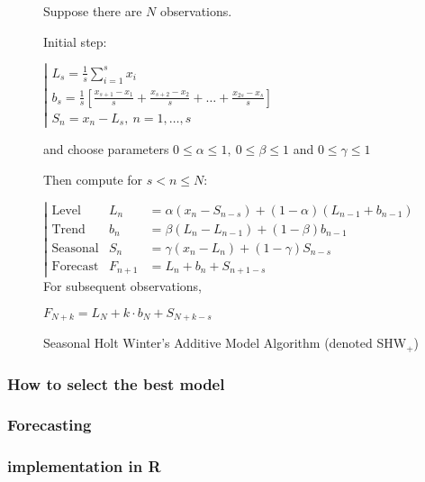 \begin{figure}[H]
\begin{tcolorbox}[width=.6\textwidth]%

Suppose there are $N$ observations.

Initial step:

$\left|\begin{array}{l}
L_s = \frac1s \sum_{i=1}^s x_i \\
b_s = \frac1s \left[\frac{x_{s+1}-x_1}{s}+\frac{x_{s+2}-x_2}{s}+\dots+\frac{x_{2s}-x_s}{s}\right]\\
S_n  = x_n-L_s, \ n=1,\dots,s
\end{array}\right.$

and choose parameters $0\leq\alpha\leq1,\ 0\leq\beta\leq1$ and $0\leq\gamma\leq1$

Then compute for $s<n\leq N$:

$\left|\begin{array}{lll}
\text{Level} &       L_n & = \alpha (x_n-S_{n-s})+(1-\alpha)(L_{n-1}+b_{n-1})\\
\text{Trend} &      b_n & = \beta(L_n-L_{n-1})+(1-\beta)b_{n-1}\\
\text{Seasonal} & S_n & = \gamma (x_n-L_n) + (1-\gamma)S_{n-s}\\
\text{Forecast} & F_{n+1} & = L_n+b_n+S_{n+1-s}
\end{array}\right.$
For subsequent observations,

$F_{N+k}=L_N+k\cdot b_N+S_{N+k-s}$
\label{SHWx}
\end{tcolorbox}
\caption{Seasonal Holt Winter’s Additive Model Algorithm (denoted SHW$_{+}$)}
\end{figure}


\subsubsection{How to select the best model}

\subsubsection{Forecasting}

\subsubsection{implementation in R}

